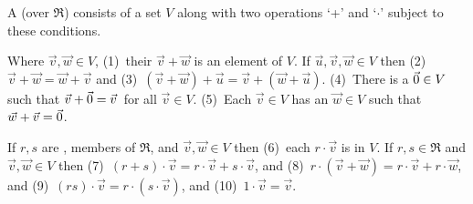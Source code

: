 \begin{definition}
\label{def:VecSpace}
A 
(over \( \Re \)) consists of a set \( V \) along with
two operations `+' and `\( \cdot \)' subject to these conditions.

Where \( \vec{v},\vec{w}\in V \), 
(1)~their %
     \( \vec{v}+\vec{w} \) is an element of \( V \).
If \( \vec{u},\vec{v},\vec{w}\in V \) then 
(2)~\( \vec{v}+\vec{w}=\vec{w}+\vec{v} \) and 
(3)~\( (\vec{v}+\vec{w})+\vec{u}=\vec{v}+(\vec{w}+\vec{u}) \).
(4)~There is a %
    \( \vec{0}\in V \) such that
    \( \vec{v}+\vec{0}=\vec{v}\, \) for all \( \vec{v}\in V\).
(5)~Each \( \vec{v}\in V \) has an
    \( \vec{w}\in V \) such that \( \vec{w}+\vec{v}=\vec{0} \).

If \( r,s \) are ,
members of \( \Re \),
and \( \vec{v},\vec{w}\in V \) then 
(6)~each
%
     \( r\cdot\vec{v} \) is in \( V \).
If \( r,s\in\Re \) and \( \vec{v},\vec{w}\in V \) then
(7)~\( (r+s)\cdot\vec{v}=r\cdot\vec{v}+s\cdot\vec{v} \), 
and (8)~\( r\cdot(\vec{v}+\vec{w})
               =r\cdot\vec{v}+r\cdot\vec{w} \),
and (9)~\( (rs)\cdot\vec{v} =r\cdot(s\cdot\vec{v}) \),
and (10)~\( 1\cdot\vec{v}=\vec{v} \).
\end{definition}
